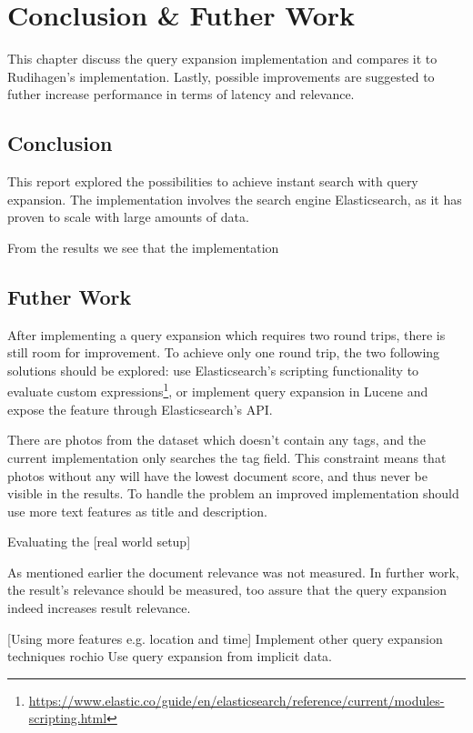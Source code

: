 \chapter{Conclusion \& Futher Work}
\label{ch:conclusion}
This chapter discuss the query expansion implementation and compares it to Rudihagen's implementation.
Lastly, possible improvements are suggested to futher increase performance in terms of latency and relevance.

\section{Conclusion}
This report explored the possibilities to achieve instant search with query expansion.
The implementation involves the search engine Elasticsearch, as it has proven to scale with large amounts of data.

From the results we see that the implementation


\section{Futher Work}
After implementing a query expansion which requires two round trips, there is still room for improvement.
To achieve only one round trip, the two following solutions should be explored:
use Elasticsearch's scripting functionality to evaluate custom expressions\footnote{\url{https://www.elastic.co/guide/en/elasticsearch/reference/current/modules-scripting.html}},
or implement query expansion in Lucene and expose the feature through Elasticsearch's API.

There are photos from the dataset which doesn't contain any tags,
and the current implementation only searches the tag field.
This constraint means that photos without any will have the lowest document score, and thus never be visible in the results.
To handle the problem an improved implementation should use more text features as title and description.

Evaluating the
[real world setup]

As mentioned earlier the document relevance was not measured.
In further work, the result's relevance should be measured, too assure that the query expansion indeed increases result relevance.


[Using more features e.g. location and time]
Implement other query expansion techniques rochio
Use query expansion from implicit data.
